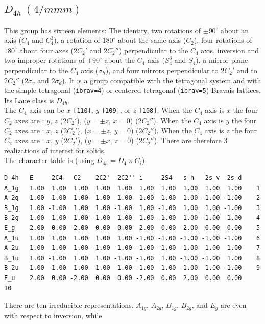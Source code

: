 \documentclass[12pt,a4paper]{article}
\begin{document}
\newpage
\subsection{\color{web-blue}$D_{4h}\ (4/mmm)$} 
This group has sixteen elements: The identity, two rotations of $\pm90^\circ$
about an axis ($C_4$ and $C_4^3$), a rotation of $180^\circ$ about the 
same axis ($C_2$), four rotations of $180^\circ$ about four axes ($2C_2'$
and $2C_2''$) perpendicular to the $C_4$ axis, inversion and two improper 
rotations of $\pm90^\circ$ about the $C_4$ axis ($S_4^3$ and $S_4$), a 
mirror plane perpendicular to the $C_4$ axis ($\sigma_h$),
and four mirrors perpendicular to $2C_2'$ and to $2C_2''$ 
($2\sigma_v$ and $2\sigma_d$). 
It is a group compatible with the tetragonal system 
and with the simple tetragonal (\texttt{ibrav=4}) or centered tetragonal
(\texttt{ibrav=5}) Bravais lattices. \\
Its Laue class is $D_{4h}$. \\
The $C_4$ axis can be $x$ \texttt{[110]}, $y$ \texttt{[109]}, 
or $z$ \texttt{[108]}. 
When the $C_4$ axis is $x$ the four $C_2$ axes are : $y$, $z$ ($2C_2'$),
($y=\pm z$, $x=0$) ($2C_2''$).  
When the $C_4$ axis is $y$ the four $C_2$ axes are : $x$, $z$ ($2C_2'$),
($x=\pm z$, $y=0$) ($2C_2''$).  
When the $C_4$ axis is $z$ the four $C_2$ axes are : $x$, $y$ ($2C_2'$),
($y=\pm x$, $z=0$) ($2C_2''$).  
There are therefore $3$ realizations of interest for solids. \\
The character table is (using $D_{4h}=D_4 \times C_i$):
\begin{verbatim}
D_4h   E     2C4   C2    2C2'  2C2'' i     2S4   s_h   2s_v  2s_d 
A_1g   1.00  1.00  1.00  1.00  1.00  1.00  1.00  1.00  1.00  1.00    1
A_2g   1.00  1.00  1.00 -1.00 -1.00  1.00  1.00  1.00 -1.00 -1.00    2
B_1g   1.00 -1.00  1.00  1.00 -1.00  1.00 -1.00  1.00  1.00 -1.00    3
B_2g   1.00 -1.00  1.00 -1.00  1.00  1.00 -1.00  1.00 -1.00  1.00    4
E_g    2.00  0.00 -2.00  0.00  0.00  2.00  0.00 -2.00  0.00  0.00    5
A_1u   1.00  1.00  1.00  1.00  1.00 -1.00 -1.00 -1.00 -1.00 -1.00    6
A_2u   1.00  1.00  1.00 -1.00 -1.00 -1.00 -1.00 -1.00  1.00  1.00    7
B_1u   1.00 -1.00  1.00  1.00 -1.00 -1.00  1.00 -1.00 -1.00  1.00    8
B_2u   1.00 -1.00  1.00 -1.00  1.00 -1.00  1.00 -1.00  1.00 -1.00    9
E_u    2.00  0.00 -2.00  0.00  0.00 -2.00  0.00  2.00  0.00  0.00    10
\end{verbatim}
There are ten irreducible representations. $A_{1g}$, $A_{2g}$, $B_{1g}$, 
$B_{2g}$, and $E_g$ are even with respect to inversion, while 
\end{document}
